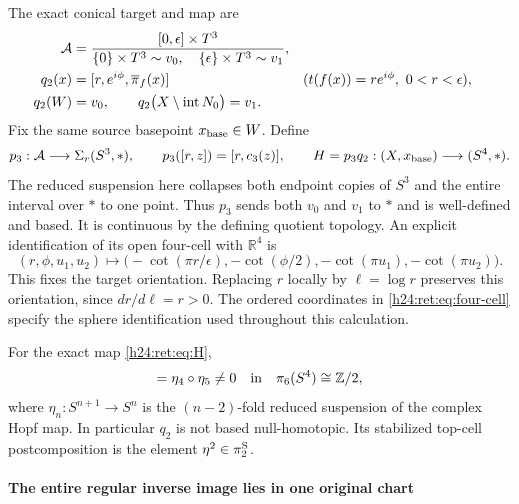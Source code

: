 The exact conical target and map are
\begin{align}
 \mathcal A&=
 \frac{[0,\epsilon]\times T^3}
 {\{0\}\times T^3\sim v_0,\quad
  \{\epsilon\}\times T^3\sim v_1},
 \label{h24:ret:eq:A-target}\\
 q_2(x)&=[r,e^{i\phi},\overline\pi_f(x)]
       &&(t(f(x))=re^{i\phi},\ 0<r<\epsilon),\notag\\
 q_2(W)&=v_0,\qquad
 q_2\bigl(X\setminus\operatorname{int}N_0\bigr)=v_1.
 \label{h24:ret:eq:q2}
\end{align}
Fix the same source basepoint \(x_{\rm base}\in W\).  Define
\begin{equation}
 p_3:\mathcal A\longrightarrow\Sigma_r(S^3,*),\qquad
 p_3([r,z])=[r,c_3(z)],\qquad
 H=p_3q_2:(X,x_{\rm base})\longrightarrow(S^4,*).
 \label{h24:ret:eq:H}
\end{equation}
The reduced suspension here collapses both endpoint copies of \(S^3\)
and the entire interval over \(*\) to one point.  Thus \(p_3\) sends
both \(v_0\) and \(v_1\) to \(*\) and is well-defined and based.
It is continuous by the defining quotient topology.  An explicit
identification of its open four-cell with \(\mathbb R^4\) is
\begin{equation}
 (r,\phi,u_1,u_2)\longmapsto
 \bigl(-\cot(\pi r/\epsilon),-\cot(\phi/2),
       -\cot(\pi u_1),-\cot(\pi u_2)\bigr).
 \label{h24:ret:eq:four-cell}
\end{equation}
This fixes the target orientation.  Replacing \(r\) locally by
\(\ell=\log r\) preserves this orientation, since \(dr/d\ell=r>0\).
The ordered coordinates in \eqref{h24:ret:eq:four-cell} specify the sphere
identification used throughout this calculation.

\begin{theorem}
\label{h24:ret:main}
For the exact map \eqref{h24:ret:eq:H},
\begin{equation}
 [H]=\eta_4\circ\eta_5\ne0
       \quad\hbox{in}\quad\pi_6(S^4)\cong\mathbb Z/2,
 \label{h24:ret:eq:main-class}
\end{equation}
where \(\eta_n:S^{n+1}\to S^n\) is the \((n-2)\)-fold reduced
suspension of the complex Hopf map.  In particular \(q_2\) is not
based null-homotopic.  Its stabilized top-cell postcomposition is the
element \(\eta^2\in\pi_2^{\rm S}\).
\end{theorem}

\paragraph{The entire regular inverse image lies in one original chart}

